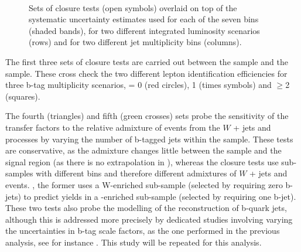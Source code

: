 \begin{figure}[h!]
\begin{center}
     \\
    \caption{Sets of closure tests (open symbols) overlaid on top of
      the systematic uncertainty estimates used for each of the seven
      \scalht bins (shaded bands), for two different integrated
      luminosity scenarios (rows) and for two different jet
      multiplicity bins (columns).}
    \label{fig:closure}
  \end{center} 
\end{figure}

The first three sets of closure tests are carried out between the \mj
sample and the \ej sample. These cross check the two different lepton
identification efficiencies for three b-tag multiplicity scenarios,
\njet = 0 (red circles), 1 (times symbols) and $\geq$2 (squares).

The fourth (triangles) and fifth (green crosses) sets probe the
sensitivity of the transfer factors to the relative admixture of
events from the $W$ + jets and \ttbar processes by varying the number
of b-tagged jets within the \mj sample. These tests are conservative,
as the admixture changes little between the \mj sample and the signal
region (as there is no extrapolation in \nb), whereas the closure
tests use sub-samples with different \nb bins and therefore different
admixtures of $W$ + jets and \ttbar events. \eg, the former uses a
W-enriched sub-sample (selected by requiring zero b-jets) to predict
yields in a \ttbar-enriched sub-sample (selected by requiring one
b-jet).  These two tests also probe the modelling of the
reconstruction of b-quark jets, although this is addressed more
precisely by dedicated studies involving varying the uncertainties in
b-tag scale factors, as the one performed in the previous analysis,
see for instance \cite{CMS_AN_2013-366}. This study will be repeated
for this analysis.


